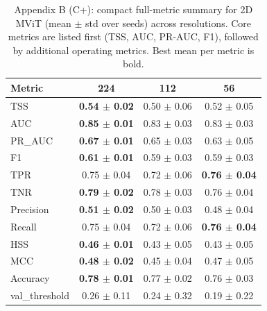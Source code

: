 \begin{table}[p]
\centering
\footnotesize
\setlength{\tabcolsep}{4pt}
\caption{Appendix B (C+): compact full-metric summary for 2D MViT (mean $\pm$ std over seeds) across resolutions. Core metrics are listed first (TSS, AUC, PR-AUC, F1), followed by additional operating metrics. Best mean per metric is bold.}
\label{tab:appB_compact_cplus}
\begin{tabular}{lccc}
\toprule
Metric & 224 & 112 & 56 \\
\midrule
TSS & \textbf{0.54 $\pm$ 0.02} & 0.50 $\pm$ 0.06 & 0.52 $\pm$ 0.05 \\
AUC & \textbf{0.85 $\pm$ 0.01} & 0.83 $\pm$ 0.03 & 0.83 $\pm$ 0.03 \\
PR\_AUC & \textbf{0.67 $\pm$ 0.01} & 0.65 $\pm$ 0.03 & 0.63 $\pm$ 0.05 \\
F1 & \textbf{0.61 $\pm$ 0.01} & 0.59 $\pm$ 0.03 & 0.59 $\pm$ 0.03 \\
TPR & 0.75 $\pm$ 0.04 & 0.72 $\pm$ 0.06 & \textbf{0.76 $\pm$ 0.04} \\
TNR & \textbf{0.79 $\pm$ 0.02} & 0.78 $\pm$ 0.03 & 0.76 $\pm$ 0.04 \\
Precision & \textbf{0.51 $\pm$ 0.02} & 0.50 $\pm$ 0.03 & 0.48 $\pm$ 0.04 \\
Recall & 0.75 $\pm$ 0.04 & 0.72 $\pm$ 0.06 & \textbf{0.76 $\pm$ 0.04} \\
HSS & \textbf{0.46 $\pm$ 0.01} & 0.43 $\pm$ 0.05 & 0.43 $\pm$ 0.05 \\
MCC & \textbf{0.48 $\pm$ 0.02} & 0.45 $\pm$ 0.04 & 0.47 $\pm$ 0.05 \\
Accuracy & \textbf{0.78 $\pm$ 0.01} & 0.77 $\pm$ 0.02 & 0.76 $\pm$ 0.03 \\
val\_threshold & 0.26 $\pm$ 0.11 & 0.24 $\pm$ 0.32 & 0.19 $\pm$ 0.22 \\
\bottomrule
\end{tabular}
\end{table}
